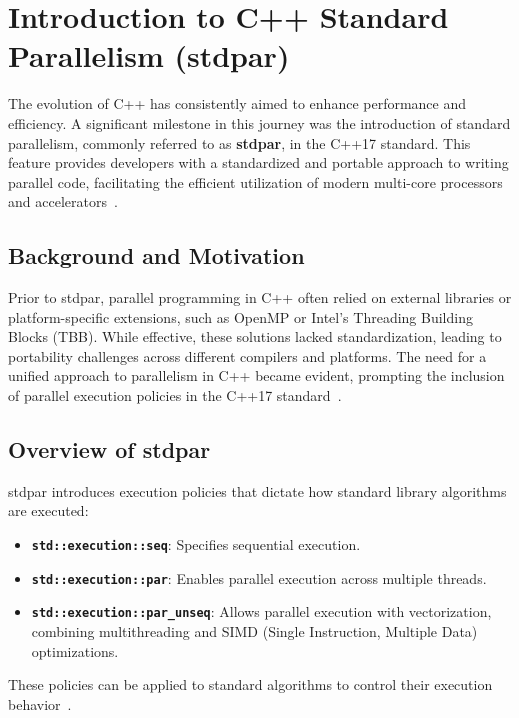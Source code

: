 \section{Introduction to C++ Standard Parallelism (stdpar)}
\label{sec:stdpar}

The evolution of C++ has consistently aimed to enhance performance and efficiency. A significant milestone in
this journey was the introduction of standard parallelism, commonly referred to as \textbf{stdpar}, in the
C++17 standard. This feature provides developers with a standardized and portable approach to writing parallel
code, facilitating the efficient utilization of modern multi-core processors and accelerators~\cite{V'yukova2018}.

\subsection{Background and Motivation}

Prior to stdpar, parallel programming in C++ often relied on external libraries or platform-specific
extensions, such as OpenMP or Intel's Threading Building Blocks (TBB). While effective, these solutions lacked
standardization, leading to portability challenges across different compilers and platforms. The need for a
unified approach to parallelism in C++ became evident, prompting the inclusion of parallel execution policies
in the C++17 standard~\cite{V'yukova2018}.

\subsection{Overview of stdpar}

stdpar introduces execution policies that dictate how standard library algorithms are executed:

\begin{itemize}
  \item \textbf{\texttt{std::execution::seq}}: Specifies sequential execution.
  \item \textbf{\texttt{std::execution::par}}: Enables parallel execution across multiple threads.
  \item \textbf{\texttt{std::execution::par\_unseq}}: Allows parallel execution with vectorization, combining
  multithreading and SIMD (Single Instruction, Multiple Data) optimizations.
\end{itemize}

These policies can be applied to standard algorithms to control their execution behavior~\cite{V'yukova2018}.

